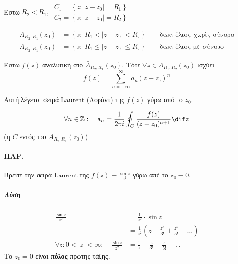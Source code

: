 \documentclass[12pt,a4paper,notitlepage,fleqn]{article}
\begin{document}
  \paragraph{}

  \begin{theorem*}{}
  	Έστω \( R_2 < R_1,\ \begin{array}{l}
  	C_1 = \left\lbrace z:|z-z_0| = R_1 \right\rbrace \\
  	C_2 = \left\lbrace z:|z-z_0| = R_2 \right\rbrace
  	\end{array} \)

  	\begin{align*}
  	A_{R_2,R_1}(z_0) &= \left\lbrace
  	z:\ R_1 < |z-z_0| < R_2
  	 \right\rbrace \qquad \text{δακτύλιος χωρίς σύνορο} \\
  	\bar A_{R_2,R_1}(z_0) &= \left\lbrace
  	z:\ R_1 \leq | z - z_0 | \leq R_2
  	 \right\rbrace \qquad \text{δακτύλιος με σύνορο}
  	\end{align*}


  	Έστω \( f(z) \) αναλυτική στο \( \bar A_{R_2,R_1}(z_0) \). Τότε \( \forall z
  	\in A_{R_1,R_2}(z_0) \) ισχύει \[
  	f(z) = \sum_{n=-\infty}^\infty a_n (z-z_0)^n
  	\]

  	Αυτή λέγεται σειρά Laurent (Λοράντ) της \( f(z) \) γύρω από το \( z_0 \).

  	\[
  	\forall n \in \mathbb Z: \quad a_n=\frac{1}{2\pi i}\oint_C
  	\frac{f(z)}{(z-z_0)^{n+1}}\dif z
  	\] (η \( C \) εντός του \( A_{R_2,R_1}(z_0) \))
  \end{theorem*}

  \paragraph{ΠΑΡ.}
  Βρείτε την σειρά Laurent της \( f(z) = \frac{\sin z}{z^2} \) γύρω από το
  \( z_0 = 0 \).
  \subparagraph{Λύση}
  \begin{align*}
  \frac{\sin z}{z^2}&=\frac{1}{z^2}\cdot \sin z
  \\ &= \frac{1}{z^2}\left( z-\frac{z^3}{3!}+\frac{z^5}{5!}-\dots \right)
  \\ \forall z: 0<|z|<\infty: \quad \frac{\sin z}{z^2} &= \frac{1}{z}-\frac{z}{3!}
  +\frac{z}{5!}-\dots
  \end{align*}
  Το \( z_0 = 0 \) είναι \textbf{πόλος} πρώτης τάξης.
\end{document}
